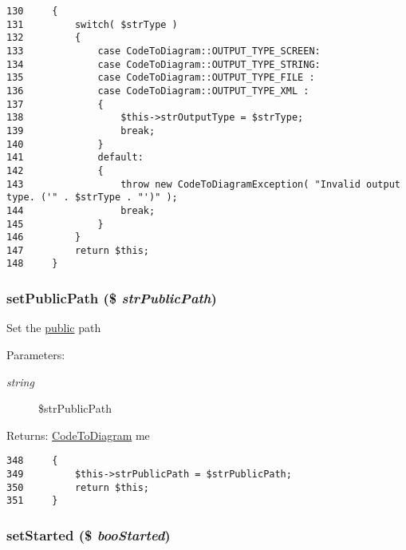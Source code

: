 \begin{Code}\begin{verbatim}130     {
131         switch( $strType )
132         {
133             case CodeToDiagram::OUTPUT_TYPE_SCREEN:
134             case CodeToDiagram::OUTPUT_TYPE_STRING:
135             case CodeToDiagram::OUTPUT_TYPE_FILE :
136             case CodeToDiagram::OUTPUT_TYPE_XML :
137             {
138                 $this->strOutputType = $strType;
139                 break;
140             }
141             default:
142             {
143                 throw new CodeToDiagramException( "Invalid output type. ('" . $strType . "')" );
144                 break;
145             }
146         }
147         return $this;
148     }
\end{verbatim}
\end{Code}


\hypertarget{class_code_to_diagram_261f2bb173e655f2ead64eda4c29e76a}{
\subsubsection[{setPublicPath}]{\setlength{\rightskip}{0pt plus 5cm}setPublicPath (\$ {\em strPublicPath})}}
\label{class_code_to_diagram_261f2bb173e655f2ead64eda4c29e76a}


Set the \hyperlink{namespacepublic}{public} path

\begin{Desc}
\item[Parameters:]
\begin{description}
\item[{\em string}]\$strPublicPath \end{description}
\end{Desc}
\begin{Desc}
\item[Returns:]\hyperlink{class_code_to_diagram}{CodeToDiagram} me \end{Desc}


\begin{Code}\begin{verbatim}348     {
349         $this->strPublicPath = $strPublicPath;
350         return $this;
351     }
\end{verbatim}
\end{Code}


\hypertarget{class_code_to_diagram_2aeb1b7ec5740287e34c15209fab8b78}{
\subsubsection[{setStarted}]{\setlength{\rightskip}{0pt plus 5cm}setStarted (\$ {\em booStarted})}}
\label{class_code_to_diagram_2aeb1b7ec5740287e34c15209fab8b78}


